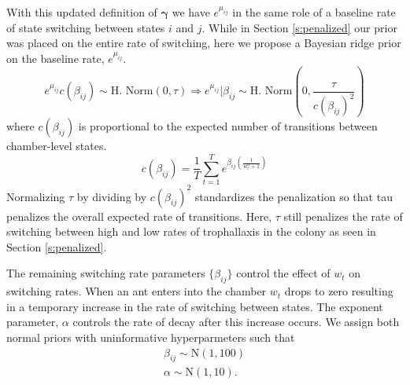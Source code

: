 \documentclass[smallextended]{svjour3}       %
\begin{document}
With this updated definition of $\bm{\gamma}$ we have $e^{\mu_{ij}}$ in the same role of a baseline rate of state switching between states $i$ and $j$. While in Section \ref{s:penalized} our prior was placed on the entire rate of switching, here we propose a Bayesian ridge prior on the baseline rate, $e^{\mu_{ij}}$. 
\begin{equation}
 e^{\mu_{ij}} 
c(\beta_{ij})
\sim 
\text{H. Norm}(0, \tau)
\Rightarrow 
e^{\mu_{ij}} | \beta_{ij} \sim \text{H. Norm}\left(0, \frac{\tau}{c(\beta_{ij})^2}\right)
 \end{equation}
 where $c(\beta_{ij})$ is proportional to the expected number of transitions between chamber-level states.
\begin{equation}
  c(\beta_{ij}) =  \frac{1}{T}\sum_{t = 1}^T e^{\beta_{ij}\left(\frac{1}{w_t^{\alpha} + 1}\right)}
\end{equation}
Normalizing $\tau$ by dividing by $c(\beta_{ij})^2$ standardizes the penalization so that tau penalizes the overall expected rate of transitions. Here, $\tau$ still penalizes the rate of switching between high and low rates of trophallaxis in the colony as seen in Section \ref{s:penalized}. 

The remaining switching rate parameters $\{\beta_{ij}\}$ control the effect of $w_t$ on switching rates. When an ant enters into the chamber $w_t$ drops to zero resulting in a temporary increase in the rate of switching between states. The exponent parameter, $\alpha$ controls the rate of decay after this increase occurs. We assign both normal priors with uninformative hyperparmeters such that
\begin{equation}
\begin{aligned}
\beta_{ij} \sim \text{N}(1, 100)\\
\alpha \sim \text{N}(1, 10).
\end{aligned}
\end{equation}
\end{document}
